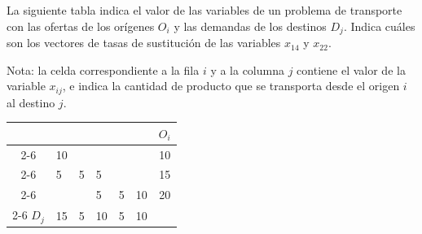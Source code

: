 La siguiente tabla indica el valor de las variables de un problema de transporte con las ofertas de los orígenes $O_i$ y las demandas de los destinos $D_j$. Indica cuáles son los vectores de tasas de sustitución de las variables $x_{14}$ y $x_{22}$.

Nota: la celda correspondiente a la fila $i$ y a la columna $j$ contiene el valor de la variable $x_{ij}$, e indica la cantidad de producto que se transporta desde el origen $i$ al destino $j$.

\begin{table}[h]
\begin{center}

\begin{tabular}{ccccccc}
                      &                         &                        &                        &                        &                         & $O_i$ \\ \cline{2-6}
\multicolumn{1}{l|}{} & \multicolumn{1}{l|}{10} & \multicolumn{1}{l|}{}  & \multicolumn{1}{l|}{}  & \multicolumn{1}{l|}{}  & \multicolumn{1}{l|}{}   & 10    \\ \cline{2-6}
\multicolumn{1}{l|}{} & \multicolumn{1}{l|}{5}  & \multicolumn{1}{l|}{5} & \multicolumn{1}{l|}{5} & \multicolumn{1}{l|}{}  & \multicolumn{1}{l|}{}   & 15    \\ \cline{2-6}
\multicolumn{1}{l|}{} & \multicolumn{1}{l|}{}   & \multicolumn{1}{l|}{}  & \multicolumn{1}{l|}{5} & \multicolumn{1}{l|}{5} & \multicolumn{1}{l|}{10} & 20    \\ \cline{2-6}
$D_j$                 & 15                      & 5                      & 10                     & 5                      & 10                      &      
\end{tabular}
    
\end{center}
\end{table}